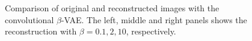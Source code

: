 \begin{figure}[!htb]
\qquad
{}
\caption{Comparison of original and reconstructed images with the convolutional $\beta$-VAE. The left, middle and right panels shows the reconstruction with $\beta=0.1, 2, 10$, respectively.}
\label{fig:beta_recon_conv_vae_bmnist}
\end{figure}





